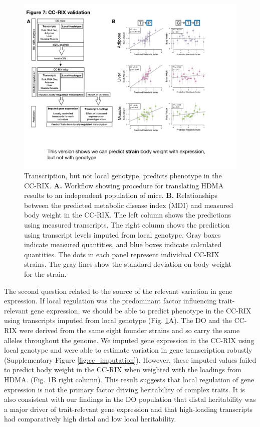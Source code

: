 \documentclass[
]{article}
\begin{document}
\begin{figure}[ht!]
\includegraphics[width=\textwidth]{Figures/Fig7_CC_Prediction.pdf} 
\caption{Transcription, but not local genotype, predicts 
phenotype in the CC-RIX. \textbf{A.} Workflow showing procedure 
for translating HDMA results to an independent population of mice. 
\textbf{B.} Relationships between the predicted metabolic disease
index (MDI) and measured body weight in the CC-RIX. The left column 
shows the predictions using measured transcripts. The right column 
shows the prediction using transcript levels imputed from local 
genotype. Gray boxes indicate measured quantities, and blue boxes 
indicate calculated quantities. The dots in each panel represent 
individual CC-RIX strains. The gray lines show the standard deviation 
on body weight for the strain.
}
\label{fig:cc_prediction}
\end{figure}

The second question related to the source of the relevant variation in
gene expression. If local regulation was the predominant factor
influencing trait-relevant gene expression, we should be able to predict
phenotype in the CC-RIX using transcripts imputed from local genotype
(Fig. \ref{fig:cc_prediction}A). The DO and the CC-RIX were derived from
the same eight founder strains and so carry the same alleles throughout
the genome. We imputed gene expression in the CC-RIX using local
genotype and were able to estimate variation in gene transcription
robustly (Supplementary Figure \ref{fig:cc_imputation}). However, these
imputed values failed to predict body weight in the CC-RIX when weighted
with the loadings from HDMA. (Fig. \ref{fig:cc_prediction}B right
column). This result suggests that local regulation of gene expression
is not the primary factor driving heritability of complex traits. It is
also consistent with our findings in the DO population that distal
heritability was a major driver of trait-relevant gene expression and
that high-loading transcripts had comparatively high distal and low
local heritability.
\end{document}
